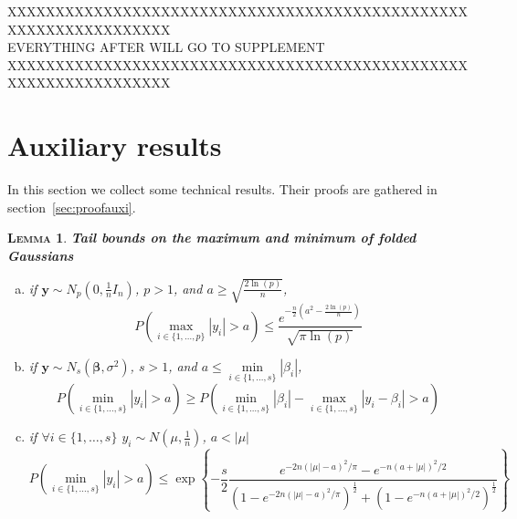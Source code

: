 \documentclass[aos]{imsart}
\theoremstyle{plain}
\newtheorem{lem}{\textsc{Lemma}}[section]
\newcommand{\bs}{\boldsymbol}
\begin{document}



XXXXXXXXXXXXXXXXXXXXXXXXXXXXXXXXXXXXXXXXXXXXXXXXXXXXXXXXXXXXXXXXX\\
EVERYTHING AFTER WILL GO TO SUPPLEMENT\\
XXXXXXXXXXXXXXXXXXXXXXXXXXXXXXXXXXXXXXXXXXXXXXXXXXXXXXXXXXXXXXXXX\\
\section{Auxiliary results}\label{auxiliary}

In this section we collect some technical results. Their proofs are gathered in section~\ref{sec:proofauxi}. 

\begin{lem}\label{lemma:3tailbounds}\textbf{Tail bounds on the maximum and minimum of folded Gaussians} 
\begin{enumerate}[a)]
    \item if $\bs y\sim N_p\left(0,\frac{1}{n}I_n \right)$, $p>1$, and $a \geq \sqrt{\frac{2\ln(p)}{n}}$, $$P\left(\underset{i\in\{1,\ldots,p\}}{\max}|y_i|> a \right) \leq \frac{e^{-\frac{n}{2}\left(a^2-\frac{2\ln (p)}{n}\right)}}{\sqrt{\pi\ln (p)}}$$
    \item if $\bs y\sim N_s\left(\bs\beta,\sigma^2\right)$, $s>1$, and $a \leq \underset{i\in\{1,\ldots,s\}}{\min}|\beta_i|$,
        $$P\left(\underset{i\in\{1,\ldots,s\}}{\min}|y_i| > a\right) \geq P\left(\underset{i\in\{1,\ldots,s\}}{\min}|\beta_i|-\underset{i\in\{1,\ldots,s\}}{\max}|y_i-\beta_i| > a \right)$$
    \item if $\forall i\in\{1,\ldots,s\}$ $y_i\sim N\left(\mu,\frac{1}{n}\right)$, $a<|\mu|$
        $$P\left(\underset{i\in\{1,\ldots,s\}}{\min}|y_i| > a \right) \leq \exp\left\{-\frac{s}{2}\frac{e^{-2n(|\mu|-a)^2/\pi}-e^{-n(a+|\mu|)^2/2}}{\left(1-e^{-2n(|\mu|-a)^2/\pi}\right)^{\frac{1}{2}}+\left(1-e^{-n(a+|\mu|)^2/2}\right)^{\frac{1}{2}}}\right\} $$
\end{enumerate}
\end{lem}
\end{document}
